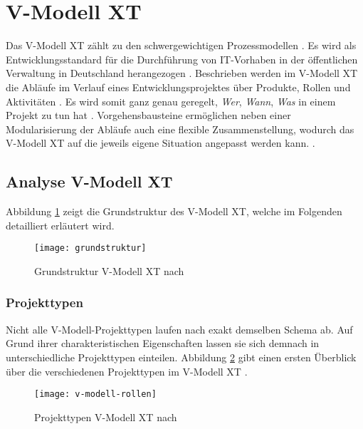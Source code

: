 \section{V-Modell XT}


Das V-Modell XT zählt zu den schwergewichtigen Prozessmodellen \cite{Hanser2010}. Es wird als Entwicklungsstandard für die Durchführung von IT-Vorhaben in der öffentlichen Verwaltung in Deutschland herangezogen \cite{Kuhrmann2011}. Beschrieben werden im V-Modell XT die Abläufe im Verlauf eines Entwicklungsprojektes über Produkte, Rollen und Aktivitäten \cite{Friedrich2008}. Es wird somit ganz genau geregelt, \textit{Wer}, \textit{Wann}, \textit{Was} in einem Projekt zu tun hat \cite{2004vmodell}. Vorgehensbausteine ermöglichen neben einer Modularisierung der Abläufe auch eine flexible Zusammenstellung, wodurch das V-Modell XT auf die jeweils eigene Situation angepasst werden kann. \cite{Friedrich2008,Zoerner2012}. \newline

\subsection{Analyse V-Modell XT}

Abbildung \ref{fig:grundstruktur} zeigt die Grundstruktur des V-Modell XT, welche im Folgenden detailliert erläutert wird.
\begin{figure}[htp]
\begin{center}
  \texttt{[image: grundstruktur]} %
  \caption{Grundstruktur V-Modell XT nach \cite{2004vmodell}}
  \label{fig:grundstruktur}
\end{center}
\end{figure}

\subsubsection{Projekttypen}
Nicht alle V-Modell-Projekttypen laufen nach exakt demselben Schema ab. Auf Grund ihrer charakteristischen Eigenschaften lassen sie sich demnach in unterschiedliche Projekttypen einteilen. Abbildung \ref{fig:Projekttypen} gibt einen ersten Überblick über die verschiedenen Projekttypen im V-Modell XT \cite{2004vmodell}.

\begin{figure}[htp]
\begin{center}
  \texttt{[image: v-modell-rollen]} %
  \caption{Projekttypen V-Modell XT nach \cite{2004vmodell}}
  \label{fig:Projekttypen}
\end{center}
\end{figure}

